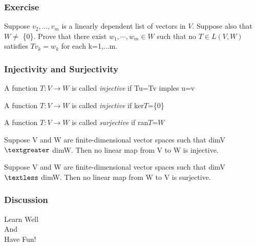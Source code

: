 \documentclass[12pt, t]{beamer}
\renewcommand{\emph}[1]{{\color{Turquoise3}\textsl{#1}}}
\begin{document}
\begin{frame}
    \frametitle{Exercise}


Suppose $v_2,...,v_m$ is a linearly dependent list of vectors in $V$. Suppose also that $W\neq$ \{0\}. Prove that there exist $w_1,\cdots,w_m \in W$ such that no $T\in L(V,W)$ satisfies $Tv_k =w_k$ for each k=1,...m.
\end{frame}
\begin{frame}
\frametitle{Injectivity and Surjectivity}
A function $T: V \rightarrow W$ is called \emph{injective} if Tu=Tv imples u=v

A function $T: V \rightarrow W$ is called \emph{injective} if ker$T$=\{0\}

A function $T: V \rightarrow W$ is called \emph{surjective} if ran$T\textrm{=}W$

Suppose V and W are finite-dimensional vector spaces such that dimV $\textgreater$ dimW. Then no linear map from V to W is injective.
   
Suppose V and W are finite-dimensional vector spaces such that dimV $\textless$ dimW. Then no linear map from W to V is surjective.
\end{frame}
\begin{frame}
    \frametitle{Discussion}
    \vspace{1.5cm}
    \Large
    \centering
    Learn Well\\
    And\\
    Have Fun!\\


\end{frame}
\end{document}
